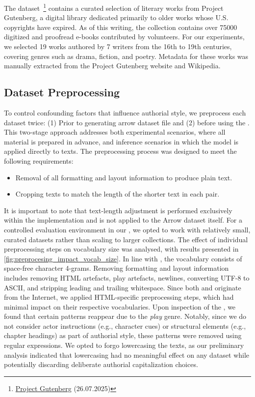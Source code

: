 The \dataGutenberg{} dataset~\footnote{\href{https://www.gutenberg.org/}{Project Gutenberg} (26.07.2025)} contains a curated selection of literary works from Project Gutenberg, a digital library dedicated primarily to older works whose U.S. copyrights have expired.
As of this writing, the collection contains over \num{75000} digitized and proofread e-books contributed by volunteers.
For our experiments, we selected 19 works authored by 7 writers from the 16th to 19th centuries, covering genres such as drama, fiction, and poetry.
Metadata for these works was manually extracted from the Project Gutenberg website and Wikipedia.


\subsection{Dataset Preprocessing}
\label{subsec:dataset_preprocessing}

To control confounding factors that influence authorial style, we preprocess each dataset twice:
(1) Prior to generating arrow dataset file and (2) before using the \impAppr{}.
This two-stage approach addresses both experimental scenarios, where all material is prepared in advance, and inference scenarios in which the \impAppr{} model is applied directly to texts.
The preprocessing process was designed to meet the following requirements:
\begin{itemize}
    \item Removal of all formatting and layout information to produce plain text.
    \item Cropping texts to match the length of the shorter text in each pair.
\end{itemize}
It is important to note that text-length adjustment is performed exclusively within the \impAppr{} implementation and is not applied to the Arrow dataset itself.
For a controlled evaluation environment in our \impAppr{}, we opted to work with relatively small, curated datasets rather than scaling to larger collections.  
The effect of individual preprocessing steps on vocabulary size was analysed, with results presented in \autoref{fig:preprocesing_impact_vocab_size}.
In line with \citep{koppel_determining_2014}, the vocabulary consists of space-free character 4-grams.
Removing formatting and layout information includes removing HTML artefacts, play artefacts, newlines, 
converting UTF-8 to ASCII, and stripping leading and trailing whitespace.
Since both \dataBlog{} and \dataPan{} originate from the Internet, we applied HTML-specific preprocessing steps, which had minimal impact on their respective vocabularies.
Upon inspection of the \dataGutenberg{}, we found that certain patterns reappear due to the \textit{play} genre. 
Notably, since we do not consider actor instructions (e.g., character cues) or structural elements (e.g., chapter headings) as part of authorial style, these patterns were removed using regular expressions.
We opted to forgo lowercasing the texts, as our preliminary analysis indicated that lowercasing had no meaningful effect on any dataset while potentially discarding deliberate authorial capitalization choices.

